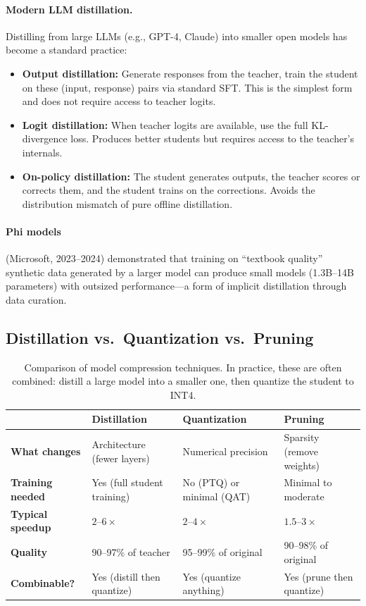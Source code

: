 \paragraph{Modern LLM distillation.}
Distilling from large LLMs (e.g., GPT-4, Claude) into smaller open models has become
a standard practice:
\begin{itemize}
    \item \textbf{Output distillation:} Generate responses from the teacher, train the
          student on these (input, response) pairs via standard SFT.  This is the
          simplest form and does not require access to teacher logits.
    \item \textbf{Logit distillation:} When teacher logits are available, use the
          full KL-divergence loss.  Produces better students but requires access to
          the teacher's internals.
    \item \textbf{On-policy distillation:} The student generates outputs, the teacher
          scores or corrects them, and the student trains on the corrections.
          Avoids the distribution mismatch of pure offline distillation.
\end{itemize}

\paragraph{Phi models} (Microsoft, 2023--2024) demonstrated that training on
``textbook quality'' synthetic data generated by a larger model can produce small models
(1.3B--14B parameters) with outsized performance---a form of implicit distillation
through data curation.

\subsection{Distillation vs.\ Quantization vs.\ Pruning}

\begin{table}[H]
\centering
\small
\begin{tabularx}{\textwidth}{@{}l X X X@{}}
\toprule
& \textbf{Distillation} & \textbf{Quantization} & \textbf{Pruning} \\
\midrule
\textbf{What changes}    & Architecture (fewer layers) & Numerical precision & Sparsity (remove weights) \\
\textbf{Training needed}  & Yes (full student training) & No (PTQ) or minimal (QAT) & Minimal to moderate \\
\textbf{Typical speedup}  & $2$--$6\times$               & $2$--$4\times$              & $1.5$--$3\times$ \\
\textbf{Quality}          & 90--97\% of teacher          & 95--99\% of original        & 90--98\% of original \\
\textbf{Combinable?}      & Yes (distill then quantize)  & Yes (quantize anything)     & Yes (prune then quantize) \\
\bottomrule
\end{tabularx}
\caption{Comparison of model compression techniques.  In practice, these are often
combined: distill a large model into a smaller one, then quantize the student to INT4.}
\label{tab:compression_comparison}
\end{table}


